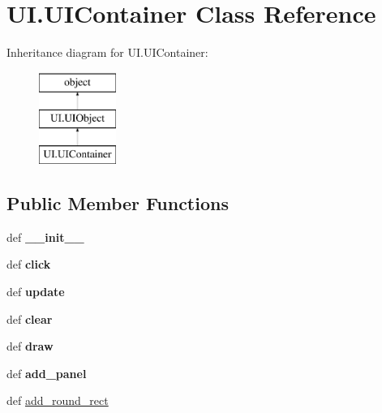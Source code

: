 \hypertarget{classUI_1_1UIContainer}{\section{U\-I.\-U\-I\-Container Class Reference}
\label{classUI_1_1UIContainer}
}
Inheritance diagram for U\-I.\-U\-I\-Container\-:\begin{figure}[H]
\begin{center}
\leavevmode
\includegraphics[height=3.000000cm]{classUI_1_1UIContainer}
\end{center}
\end{figure}
\subsection*{Public Member Functions}
\begin{DoxyCompactItemize}
\item 
\hypertarget{classUI_1_1UIContainer_a68372ab43f2d134c1a72151a86b56ef8}{def {\bfseries \-\_\-\-\_\-init\-\_\-\-\_\-}}\label{classUI_1_1UIContainer_a68372ab43f2d134c1a72151a86b56ef8}

\item 
\hypertarget{classUI_1_1UIContainer_a201ddc9bbb55ca11205edcf33e69c27a}{def {\bfseries click}}\label{classUI_1_1UIContainer_a201ddc9bbb55ca11205edcf33e69c27a}

\item 
\hypertarget{classUI_1_1UIContainer_a20bb879430ca29319f1c52b2e959e80d}{def {\bfseries update}}\label{classUI_1_1UIContainer_a20bb879430ca29319f1c52b2e959e80d}

\item 
\hypertarget{classUI_1_1UIContainer_af34ce34d5e0523ae577e182f66cf0114}{def {\bfseries clear}}\label{classUI_1_1UIContainer_af34ce34d5e0523ae577e182f66cf0114}

\item 
\hypertarget{classUI_1_1UIContainer_ac14cc54fbf3aaa0f03e039a0f1fe40ac}{def {\bfseries draw}}\label{classUI_1_1UIContainer_ac14cc54fbf3aaa0f03e039a0f1fe40ac}

\item 
\hypertarget{classUI_1_1UIContainer_a6854f4ca6e25b37ec72251a441abe08b}{def {\bfseries add\-\_\-panel}}\label{classUI_1_1UIContainer_a6854f4ca6e25b37ec72251a441abe08b}

\item 
def \hyperlink{classUI_1_1UIContainer_a8f0f0d79de8fbc4e63cee1d4d41c5490}{add\-\_\-round\-\_\-rect}
\end{DoxyCompactItemize}

